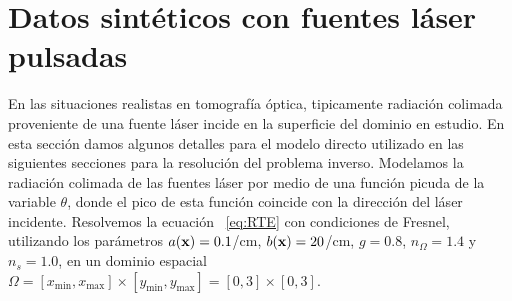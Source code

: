 \section{Datos sintéticos con fuentes láser pulsadas} 
\label{sec:sintetic} 

En las situaciones realistas en tomografía óptica, tipicamente 
radiación colimada proveniente de una fuente láser incide en 
la superficie del dominio en estudio. En esta sección damos 
algunos detalles para el modelo directo utilizado  
en las siguientes secciones para la resolución del problema inverso. 
Modelamos la radiación colimada de las fuentes láser por medio 
de una función picuda de la variable $\theta$, donde el pico 
de esta función coincide con la dirección del láser incidente. 
Resolvemos la ecuación~ \eqref{eq:RTE} con condiciones de Fresnel, 
utilizando los parámetros $a(\mathbf{x})=0.1$/cm, $b(\mathbf{x})=20$/cm, $g=0.8$, 
$n_{\Omega}=1.4$ y $n_s=1.0$, en un dominio espacial $\Omega=[x_{\text{min}},x_{\text{max}}]\times[y_{\text{min}},y_{\text{max}}]=[0,3]\times[0,3]$. 

